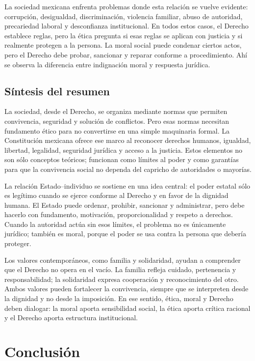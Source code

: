 \documentclass[
	spanish,
	letterpaper, oneside
]{article}
\begin{document}
La sociedad mexicana enfrenta problemas donde esta relación se vuelve evidente: corrupción, desigualdad, discriminación, violencia familiar, abuso de autoridad, precariedad laboral y desconfianza institucional. En todos estos casos, el Derecho establece reglas, pero la ética pregunta si esas reglas se aplican con justicia y si realmente protegen a la persona. La moral social puede condenar ciertos actos, pero el Derecho debe probar, sancionar y reparar conforme a procedimiento. Ahí se observa la diferencia entre indignación moral y respuesta jurídica.

\subsection{Síntesis del resumen}

La sociedad, desde el Derecho, se organiza mediante normas que permiten convivencia, seguridad y solución de conflictos. Pero esas normas necesitan fundamento ético para no convertirse en una simple maquinaria formal. La Constitución mexicana ofrece ese marco al reconocer derechos humanos, igualdad, libertad, legalidad, seguridad jurídica y acceso a la justicia. Estos elementos no son sólo conceptos teóricos; funcionan como límites al poder y como garantías para que la convivencia social no dependa del capricho de autoridades o mayorías.

La relación Estado--individuo se sostiene en una idea central: el poder estatal sólo es legítimo cuando se ejerce conforme al Derecho y en favor de la dignidad humana. El Estado puede ordenar, prohibir, sancionar y administrar, pero debe hacerlo con fundamento, motivación, proporcionalidad y respeto a derechos. Cuando la autoridad actúa sin esos límites, el problema no es únicamente jurídico; también es moral, porque el poder se usa contra la persona que debería proteger.

Los valores contemporáneos, como familia y solidaridad, ayudan a comprender que el Derecho no opera en el vacío. La familia refleja cuidado, pertenencia y responsabilidad; la solidaridad expresa cooperación y reconocimiento del otro. Ambos valores pueden fortalecer la convivencia, siempre que se interpreten desde la dignidad y no desde la imposición. En ese sentido, ética, moral y Derecho deben dialogar: la moral aporta sensibilidad social, la ética aporta crítica racional y el Derecho aporta estructura institucional.

\section{Conclusión}
\end{document}
